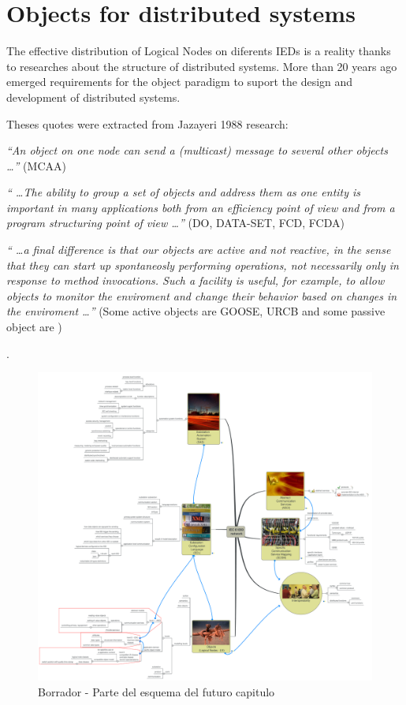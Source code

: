 \section{Objects for distributed systems}

The effective distribution of Logical Nodes 
on diferents IEDs  
is a reality thanks to researches about 
the structure of distributed systems. More 
than 20 years ago emerged requirements 
for the object paradigm to suport the 
design and development of distributed systems.

Theses quotes were extracted from Jazayeri 
1988 research:

\emph{
``An object on one node can send a (multicast) message 
to several other objects \ldots''
} (MCAA) 

\emph{
`` \ldots The ability to group 
a set of objects and address them as one entity 
is important in many applications both from an 
efficiency point of view and from a program 
structuring point of view \ldots'' 
} (DO, DATA-SET, FCD, FCDA)

\emph{
`` \ldots a final 
difference is that our objects are active and 
not reactive, in the sense that they can start 
up spontaneosly performing operations, not 
necessarily only in response to method invocations.
Such a facility is useful, for example, to allow objects 
to monitor the enviroment and change their behavior based 
on changes in the enviroment \ldots'' 
} (Some active objects 
are GOOSE, URCB and some passive object 
are )

\cite{Jazayeri:1988}.



\begin{figure}
  \includegraphics[width=1.0\textwidth]{appendices/IEC61850network}
  \caption{Borrador - Parte del esquema del futuro capitulo }
  \label{fig:lan-networks-topologies-fig1}
\end{figure}

